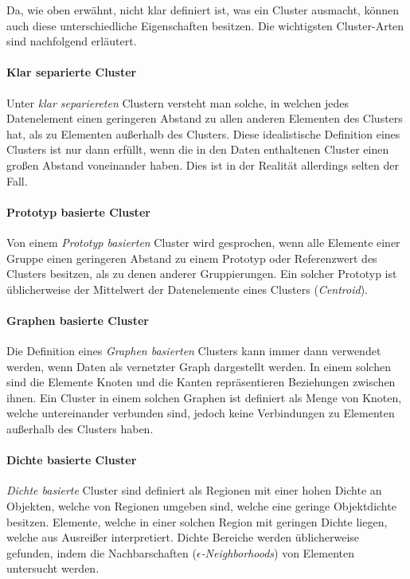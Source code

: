 Da, wie oben erwähnt, nicht klar definiert ist, was ein Cluster ausmacht, können auch diese unterschiedliche Eigenschaften
besitzen. Die wichtigsten Cluster-Arten sind nachfolgend erläutert.

\paragraph{Klar separierte Cluster}
Unter \textit{klar separiereten} Clustern versteht man solche, in welchen jedes Datenelement einen geringeren
Abstand zu allen anderen Elementen des Clusters hat, als zu Elementen außerhalb des Clusters. Diese
idealistische Definition eines Clusters ist nur dann erfüllt, wenn die in den Daten enthaltenen Cluster einen
großen Abstand voneinander haben. Dies ist in der Realität allerdings selten der Fall.

\paragraph{Prototyp basierte Cluster}
Von einem \textit{Prototyp basierten} Cluster wird gesprochen, wenn alle Elemente einer Gruppe einen
geringeren Abstand zu einem Prototyp oder Referenzwert des Clusters besitzen, als zu denen anderer Gruppierungen. 
Ein solcher Prototyp ist üblicherweise der Mittelwert der Datenelemente eines Clusters (\textit{Centroid}).

\paragraph{Graphen basierte Cluster}
Die Definition eines \textit{Graphen basierten} Clusters kann immer dann verwendet werden, wenn Daten
als vernetzter Graph dargestellt werden. In einem solchen sind die Elemente Knoten und die Kanten
repräsentieren Beziehungen zwischen ihnen. Ein Cluster in einem solchen Graphen ist definiert als Menge von
Knoten, welche untereinander verbunden sind, jedoch keine Verbindungen zu Elementen außerhalb des Clusters haben.

\paragraph{Dichte basierte Cluster}
\textit{Dichte basierte} Cluster sind definiert als Regionen mit einer hohen Dichte an Objekten, welche von
Regionen umgeben sind, welche eine geringe Objektdichte besitzen. Elemente, welche in einer solchen Region
mit geringen Dichte liegen, welche aus Ausreißer interpretiert. Dichte Bereiche werden üblicherweise
gefunden, indem die Nachbarschaften (\textit{$\epsilon$-Neighborhoods}) von Elementen untersucht werden.

